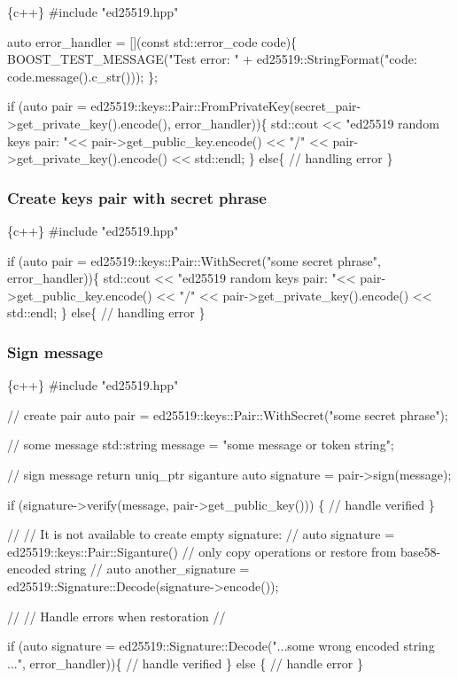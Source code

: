 \begin{DoxyCode}
\{c++\}
#include "ed25519.hpp"

auto error\_handler = [](const std::error\_code code)\{
    BOOST\_TEST\_MESSAGE("Test error: " + ed25519::StringFormat("code: %
       code.message().c\_str()));
\};

if (auto pair = ed25519::keys::Pair::FromPrivateKey(secret\_pair->get\_private\_key().encode(),
       error\_handler))\{
    std::cout << "ed25519 random keys pair: "<< pair->get\_public\_key.encode() << "/" << 
       pair->get\_private\_key().encode() << std::endl;
\}
else\{
    // handling error
\}
\end{DoxyCode}


\subsubsection*{Create keys pair with secret phrase}


\begin{DoxyCode}
\{c++\}
#include "ed25519.hpp"


if (auto pair = ed25519::keys::Pair::WithSecret("some secret phrase", error\_handler))\{
    std::cout << "ed25519 random keys pair: "<< pair->get\_public\_key.encode() << "/" << 
       pair->get\_private\_key().encode() << std::endl;
\}
else\{
    // handling error
\}
\end{DoxyCode}


\subsubsection*{Sign message}


\begin{DoxyCode}
\{c++\}
#include "ed25519.hpp"

// create pair
auto pair           = ed25519::keys::Pair::WithSecret("some secret phrase");

// some message 
std::string message = "some message or token string";

// sign message return uniq\_ptr siganture
auto signature      = pair->sign(message);

if (signature->verify(message, pair->get\_public\_key())) \{
   // handle verified
\}

//
// It is not available to create empty signature:
// auto signature = ed25519::keys::Pair::Siganture()
// only copy operations or restore from base58-encoded string 
//
auto another\_signature = ed25519::Signature::Decode(signature->encode());

//
// Handle errors when restoration
//

if (auto signature = ed25519::Signature::Decode("...some wrong encoded string ...", error\_handler))\{
    // handle verified
\}
else \{
    // handle error
\}
\end{DoxyCode}


